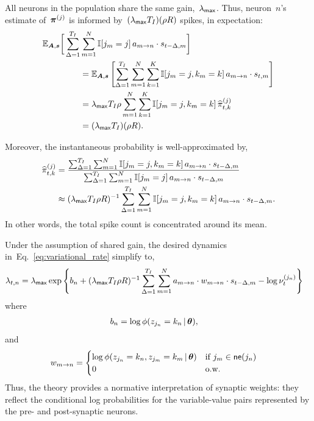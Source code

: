 \begin{assumption}
  All neurons in the population share the same gain,~$\lambda_{\mathsf{max}}$. 
  Thus, neuron~$n$'s estimate of~$\boldsymbol{\pi}^{(j)}$ is 
  informed by~$(\lambda_{\mathsf{max}} T_I)(\rho R)$ spikes, in expectation:
  \begin{align*}
    \mathbb{E}_{\boldsymbol{A},\boldsymbol{s}} \bigg[ \sum_{\Delta = 1}^{T_I} & \sum_{m=1}^N \mathbb{I}[j_m=j] \, a_{m \to n} \cdot s_{t-\Delta,m} \bigg] \\
    &= \mathbb{E}_{\boldsymbol{A},\boldsymbol{s}} \left[ \sum_{\Delta = 1}^{T_I} \sum_{m=1}^N \sum_{k=1}^K \mathbb{I}[j_m=j, k_m=k] \, a_{m \to n} \cdot s_{t,m} \right] \\
    &= \lambda_{\mathsf{max}} T_I \rho \sum_{m=1}^N \sum_{k=1}^K \mathbb{I}[j_m=j, k_m=k] \, \widehat{\pi}_{t,k}^{(j)} \\
    &= (\lambda_{\mathsf{max}} T_I) (\rho R).
  \end{align*}

  Moreover, the instantaneous probability is well-approximated by,
  \begin{align*}
      \widehat{\pi}_{t,k}^{(j)} &=
  \frac{\sum_{\Delta=1}^{T_I} \sum_{m=1}^N \mathbb{I}[j_m=j, k_m=k] \, a_{m \to n} \cdot s_{t-\Delta, m}}
       {\sum_{\Delta=1}^{T_I} \sum_{m=1}^N \mathbb{I}[j_m=j] \, a_{m \to n} \cdot s_{t-\Delta, m}} \\
       &\approx (\lambda_{\mathsf{max}} T_I \rho R)^{-1} \sum_{\Delta=1}^{T_I} \sum_{m=1}^N \mathbb{I}[j_m=j, k_m=k] \, a_{m \to n} \cdot s_{t-\Delta, m}.
  \end{align*}
  In other words, the total spike count is concentrated around its mean.
\end{assumption}

Under the assumption of shared gain, the
desired dynamics in~Eq.~\ref{eq:variational_rate}
simplify to,
\begin{align}
  \label{eq:mf_log_probs}
  \lambda_{t,n} &= \lambda_{\mathsf{max}}
  \exp \left \{b_n + (\lambda_{\mathsf{max}} T_I \rho R)^{-1} \sum_{\Delta=1}^{T_I} \sum_{m=1}^N a_{m \to n} \cdot w_{m \to n} \cdot s_{t-\Delta,m}
  - \log \nu_t^{(j_n)} \right \}
\end{align}
where
\begin{align*}
  b_n &= \log \phi(z_{j_n} = k_n \,|\, \boldsymbol{\theta}),
\end{align*}
and
\begin{align*}
  w_{m \to n} &=
  \begin{cases}
    \log \phi(z_{j_n}=k_n, z_{j_m}=k_m \,|\, \boldsymbol{\theta}) & \text{if }j_m
    \in \mathsf{ne}(j_n) \\
    0 & \text{o.w.}
  \end{cases}
\end{align*}
Thus, the theory provides a normative interpretation of synaptic
weights: they reflect the conditional log probabilities for the
variable-value pairs represented by the pre- and post-synaptic
neurons.



